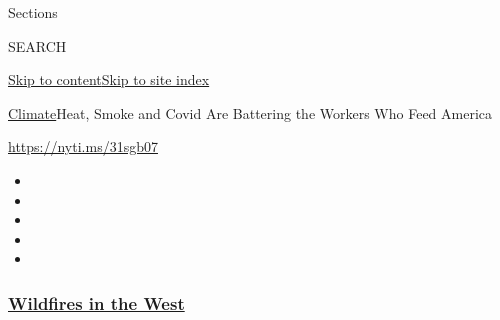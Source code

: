 Sections

SEARCH

\protect\hyperlink{site-content}{Skip to
content}\protect\hyperlink{site-index}{Skip to site index}

\href{/section/climate}{Climate}\textbar{}Heat, Smoke and Covid Are
Battering the Workers Who Feed America

\url{https://nyti.ms/31sgb07}

\begin{itemize}
\item
\item
\item
\item
\item
\end{itemize}

\hypertarget{wildfires-in-the-west}{%
\subsubsection{\texorpdfstring{\href{https://www.nytimes3xbfgragh.onion/spotlight/california-wildfires?name=styln-california-wildfires\&region=TOP_BANNER\&block=storyline_menu_recirc\&action=click\&pgtype=Article\&impression_id=47e74880-f52b-11ea-acb7-bd1162cef823\&variant=undefined}{Wildfires
in the West}}{Wildfires in the West}}\label{wildfires-in-the-west}}

